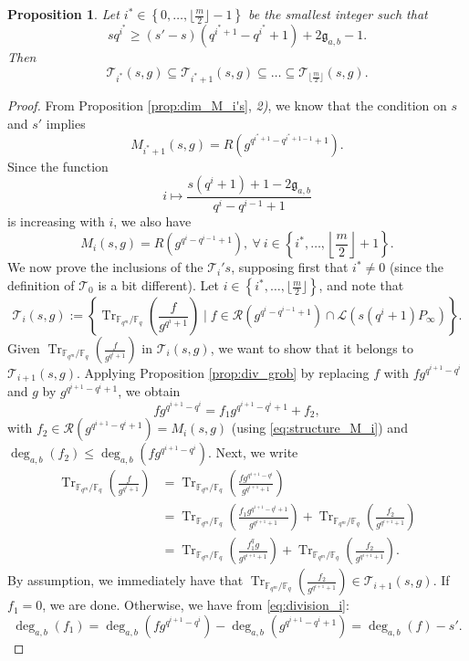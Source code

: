 \documentclass[a4paper]{article}
\newtheorem{proposition}[thm]{Proposition}
\theoremstyle{definition}
\theoremstyle{remark}
\newcommand{\calL}{\mathcal{L}}
\newcommand{\calR}{\mathcal{R}}
\newcommand{\calT}{\mathcal{T}}
\newcommand{\fq}{\mathbb{F}_{q}}
\newcommand{\Tr}[1]{\operatorname{Tr}_{\mathbb{F}_{q^m}/\fq}\left(#1\right)}
\newcommand{\set}[1]{\left\{#1\right\}}
\newcommand{\degab}[1]{\deg_{a,b}\left(#1\right)}
\begin{document}
\begin{proposition} \label{prop:inclusion_T_i's} Let $i^* \in \set{0,\dots,\lfloor\frac{m}{2}\rfloor-1}$ be the smallest integer such that 
$$sq^{i^*} \geq (s'-s)(q^{i^*+1}-q^{i^{*}}+1)+2\mathfrak{g}_{a,b}-1.$$ 
Then
$$\calT_{i^*}(s,g) \subseteq \calT_{i^*+1}(s,g) \subseteq \dots \subseteq \calT_{\lfloor \frac{m}{2}\rfloor}(s,g).$$
\end{proposition}
\begin{proof}
From Proposition \ref{prop:dim_M_i's}, \textit{2)}, we know that the condition on $s$ and $s'$ implies $$M_{i^*+1}(s,g) = R(g^{q^{i^*+1}-q^{i^*+1-1}+1}).$$ 
Since the function $$i \mapsto \dfrac{s(q^i+1)+1-2\mathfrak{g}_{a,b}}{q^i-q^{i-1}+1}$$ 
is increasing with $i$, we also have
\begin{equation} \label{eq:structure_M_i}
M_{i}(s,g) = R(g^{q^{i}-q^{i-1}+1}), \ \forall \ i \in \set{i^*,\dots,\left\lfloor \frac{m}{2}\right\rfloor+1}.
\end{equation} 
We now prove the inclusions of the $\calT_i's$, supposing first that $i^* \neq 0$ (since the definition of $\calT_0$ is a bit different). Let $i \in \set{i^*,\dots,\lfloor \frac{m}{2} \rfloor}$, and note that 
$$\calT_i(s,g) := \set{\Tr{\frac{f}{g^{q^i+1}}} \mid f \in \calR(g^{q^i-q^{i-1}+1})\cap \calL(s(q^i+1)P_\infty)}.$$
Given $\Tr{\frac{f}{g^{q^i+1}}}$ in $\calT_i(s,g)$, we want to show that it belongs to $\calT_{i+1}(s,g)$. Applying Proposition \ref{prop:div_grob} by replacing $f$ with $fg^{q^{i+1}-q^i}$ and $g$ by $g^{q^{i+1}-q^i+1}$, we obtain
\begin{equation} \label{eq:division_i}
fg^{q^{i+1}-q^i} = f_1g^{q^{i+1}-q^i+1} + f_2,
\end{equation}
with $f_2 \in \calR(g^{q^{i+1}-q^i+1}) = M_i(s,g)$ (using \eqref{eq:structure_M_i}) and $\degab{f_2} \leq \degab{fg^{q^{i+1}-q^i}}$. Next, we write
\begin{align*}
    \Tr{\frac{f}{g^{q^i+1}}} &= \Tr{\frac{fg^{q^{i+1}-q^i}}{g^{q^{i+1}+1}}} \\
                             &= \Tr{\frac{f_1g^{q^{i+1}-q^i+1}}{g^{q^{i+1}+1}}} + \Tr{\frac{f_2}{g^{q^{i+1}+1}}} \\
                             &= \Tr{\frac{f_1^qg}{g^{q^{i+1}+1}}} + \Tr{\frac{f_2}{g^{q^{i+1}+1}}}.
\end{align*}
By assumption, we immediately have that $\Tr{\frac{f_2}{g^{q^{i+1}+1}}} \in \calT_{i+1}(s,g).$
If $f_1=0$, we are done. Otherwise, we have from \eqref{eq:division_i}:
$$\degab{f_1} = \degab{fg^{q^{i+1}-q^i}} - \degab{g^{q^{i+1}-q^i+1}} = \degab{f}-s'.$$

\end{proof}
\end{document}
